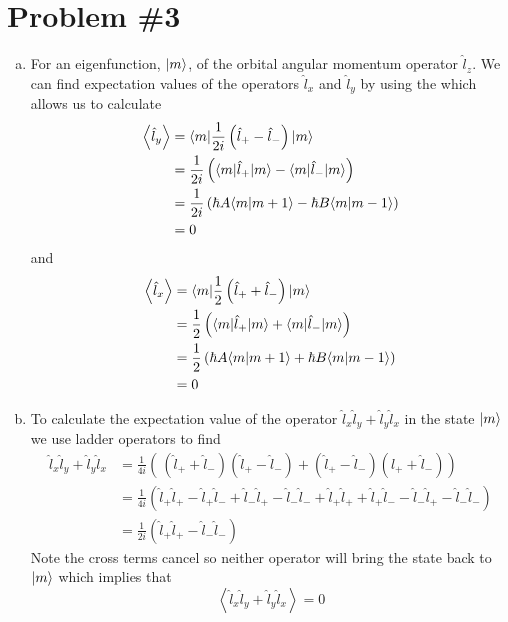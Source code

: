 \documentclass[11pt]{article}
\numberwithin{equation}{section}
\begin{document}
\pagebreak

\section{Problem \#3}
\begin{enumerate}[(a)]
\item For an eigenfunction, $|{m}\rangle$, of the orbital angular momentum operator $\hat{l}_z$.
We can find expectation values of the operators $\hat{l}_x$ and $\hat{l}_y$ by using the 
which allows us to calculate 
\begin{align*}
\left\langle\hat{l}_{y}\right\rangle &= \langle{m}|\frac{1}{2i}\left(\hat{l}_{+}-\hat{l}_{-}\right)|{m}\rangle\\
&= \frac{1}{2i}\left(\langle{m}|\hat{l}_{+}|{m}\rangle-\langle{m}|\hat{l}_{-}|{m}\rangle\right)\\
&= \frac{1}{2i}\left(\hbar{A}\langle{m}|{m+1}\rangle-\hbar{B}\langle{m}|{m-1}\rangle\right)\\
&= 0
\end{align*}
and
\begin{align*}
\left\langle\hat{l}_{x}\right\rangle &= \langle{m}|\frac{1}{2}\left(\hat{l}_{+}+\hat{l}_{-}\right)|{m}\rangle\\
&= \frac{1}{2}\left(\langle{m}|\hat{l}_{+}|{m}\rangle+\langle{m}|\hat{l}_{-}|{m}\rangle\right)\\
&= \frac{1}{2}\left(\hbar{A}\langle{m}|{m+1}\rangle+\hbar{B}\langle{m}|{m-1}\rangle\right)\\
&= 0
\end{align*}

\item
To calculate the expectation value of the operator $\hat{l}_{x}\hat{l}_{y}+\hat{l}_{y}\hat{l}_{x}$ 
in the state $|{m}\rangle$ we use ladder operators to find
\begin{align*}
\hat{l}_{x}\hat{l}_{y}+\hat{l}_{y}\hat{l}_{x} &= \frac{1}{4i}\left(\frac{}{}\left(\hat{l}_{+}+\hat{l}_{-}\right)\left(\hat{l}_{+}-\hat{l}_{-}\right)+\left(\hat{l}_{+}-\hat{l}_{-}\right)\left(\hat{l}_{+}+\hat{l}_{-}\right)\right)\\
&= \frac{1}{4i}\left(\hat{l}_{+}\hat{l}_{+} -\hat{l}_{+}\hat{l}_{-} +\hat{l}_{-}\hat{l}_{+} -\hat{l}_{-}\hat{l}_{-} +\hat{l}_{+}\hat{l}_{+} +\hat{l}_{+}\hat{l}_{-} -\hat{l}_{-}\hat{l}_{+} -\hat{l}_{-}\hat{l}_{-}\right)\\
&= \frac{1}{2i}\left(\hat{l}_{+}\hat{l}_{+} - \hat{l}_{-}\hat{l}_{-}\right)
\end{align*}
Note the cross terms cancel so neither operator will bring the state back to $|{m}\rangle$ 
which implies that
$$\left\langle\hat{l}_{x}\hat{l}_{y}+\hat{l}_{y}\hat{l}_{x}\right\rangle = 0$$


\end{enumerate}
\end{document}
